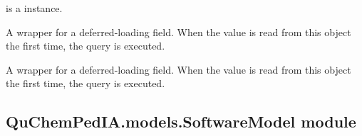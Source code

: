 \documentclass[letterpaper,10pt,english]{sphinxmanual}
\begin{document}
\begin{fulllineitems}
\begin{fulllineitems}
 is a  instance.

\end{fulllineitems}


\begin{fulllineitems}
\label{\detokenize{QuChemPedIA.models:QuChemPedIA.models.ImportRuleModel.ImportRule.id_version_id}}
A wrapper for a deferred-loading field. When the value is read from this
object the first time, the query is executed.

\end{fulllineitems}


\begin{fulllineitems}
\label{\detokenize{QuChemPedIA.models:QuChemPedIA.models.ImportRuleModel.ImportRule.objects}}
\end{fulllineitems}


\begin{fulllineitems}
\label{\detokenize{QuChemPedIA.models:QuChemPedIA.models.ImportRuleModel.ImportRule.rule}}
A wrapper for a deferred-loading field. When the value is read from this
object the first time, the query is executed.

\end{fulllineitems}


\end{fulllineitems}



\subsection{QuChemPedIA.models.SoftwareModel module}
\label{\detokenize{QuChemPedIA.models:module-QuChemPedIA.models.SoftwareModel}}\label{\detokenize{QuChemPedIA.models:quchempedia-models-softwaremodel-module}}
\end{document}
